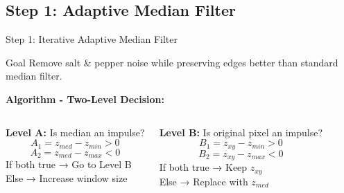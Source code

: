 \documentclass[aspectratio=169]{beamer}
\begin{document}
\subsection{Step 1: Adaptive Median Filter}

\begin{frame}{Step 1: Iterative Adaptive Median Filter}
    \begin{block}{Goal}
        Remove salt \& pepper noise while preserving edges better than standard median filter.
    \end{block}
    
    \textbf{Algorithm - Two-Level Decision:}
    
    \begin{columns}
        \textbf{Level A:} Is median an impulse?
        \begin{equation}
            A_1 = z_{med} - z_{min} > 0
        \end{equation}
        \begin{equation}
            A_2 = z_{med} - z_{max} < 0
        \end{equation}
        If both true → Go to Level B\\
        Else → Increase window size
        
        \textbf{Level B:} Is original pixel an impulse?
        \begin{equation}
            B_1 = z_{xy} - z_{min} > 0
        \end{equation}
        \begin{equation}
            B_2 = z_{xy} - z_{max} < 0
        \end{equation}
        If both true → Keep $z_{xy}$\\
        Else → Replace with $z_{med}$
    \end{columns}
\end{frame}
\end{document}
